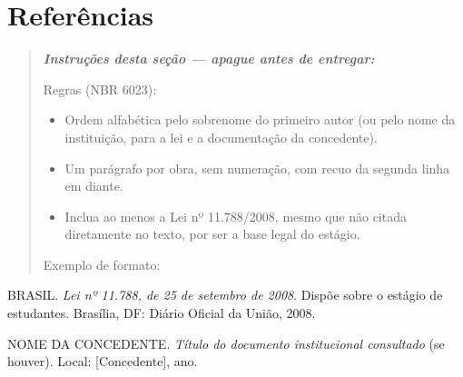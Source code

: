 \documentclass[article,12pt,a4paper]{abntex2}
\newenvironment{instrucoes}{%
  \begin{quotation}\footnotesize\itshape
  \noindent\textbf{\upshape Instruções desta seção — apague antes de entregar:}\par\smallskip
}{%
  \end{quotation}
}
\begin{document}
\section*{Referências}

\begin{instrucoes}
Regras (NBR 6023):
\begin{itemize}
  \item Ordem alfabética pelo sobrenome do primeiro autor (ou pelo nome da instituição, para a lei e a documentação da concedente).
  \item Um parágrafo por obra, sem numeração, com recuo da segunda linha em diante.
  \item Inclua ao menos a Lei nº 11.788/2008, mesmo que não citada diretamente no texto, por ser a base legal do estágio.
\end{itemize}
Exemplo de formato:
\end{instrucoes}

\newcommand{\referencia}[1]{\par\noindent\hangindent=1cm #1\par\medskip}

\referencia{BRASIL. \textit{Lei nº 11.788, de 25 de setembro de 2008}.
Dispõe sobre o estágio de estudantes. Brasília, DF: Diário Oficial da
União, 2008.}

\referencia{NOME DA CONCEDENTE. \textit{Título do documento institucional
consultado} (se houver). Local: [Concedente], ano.}
\end{document}
